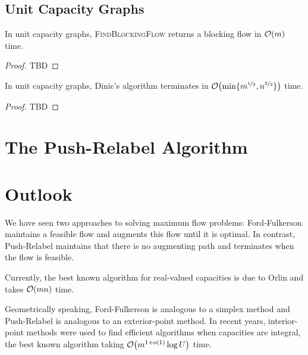 \subsection{Unit Capacity Graphs}

\begin{lem}
In unit capacity graphs, \textsc{FindBlockingFlow} returns a blocking flow in $\LandauO{m}$ time.
\end{lem}
\begin{proof}
TBD
\end{proof}

\begin{thm}
In unit capacity graphs, Dinic's algorithm terminates in $\LandauO{\min\{m^{\nicefrac{1}{2}}, n^{\nicefrac{2}{3}}\}}$ time.
\end{thm}
\begin{proof}
TBD
\end{proof}

\section{The Push-Relabel Algorithm}

\section{Outlook}

We have seen two approaches to solving maximum flow problems: Ford-Fulkerson maintains a feasible flow and augments this flow until it is optimal. In contrast, Push-Relabel maintains that there is no augmenting path and terminates when the flow is feasible.

Currently, the best known algorithm for real-valued capacities is due to Orlin and takes $\LandauO{mn}$ time.\cite{orlin2013max}

Geometrically speaking, Ford-Fulkerson is analogous to a simplex method and Push-Relabel is analogous to an exterior-point method. In recent years, interior-point methods were used to find efficient algorithms when capacities are integral, the best known algorithm taking $\LandauO{m^{1+o(1)} \log U}$ time.\cite{chen2022maximum}